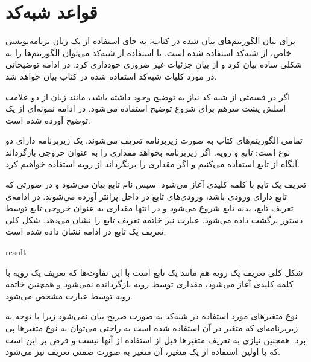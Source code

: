 \section*{قواعد شبه‌کد}

برای بیان الگوریتم‌های بیان شده در کتاب، به جای استفاده از یک زبان برنامه‌نویسی خاص، از شبه‌کد استفاده شده است. با استفاده از شبه‌کد می‌توان الگوریتم‌ها را به شکلی ساده بیان کرد و از بیان جزئیات غیر ضروری خودداری کرد. در ادامه توضیحاتی در مورد کلیات شبه‌کد استفاده شده در کتاب بیان خواهد شد.


اگر در قسمتی از شبه کد نیاز به توضیح وجود داشته باشد، مانند زبان {} از دو علامت اسلش پشت سرهم برای شروع توضیح استفاده می‌شود. در ادامه نمونه‌ای از یک توضیح آورده شده است.

\begin{latin}
\end{latin}


تمامی الگوریتم‌های کتاب به صورت زیربرنامه تعریف می‌شوند. یک زیربرنامه دارای دو نوع است: تابع و رویه. اگر زیربرنامه بخواهد مقداری را به عنوان خروجی بازگرداند آنگاه از تابع استفاده می‌کنیم و اگر مقداری را برنگرداند از رویه استفاده خواهیم کرد. 

تعریف یک تابع با کلمه کلیدی {} آغاز می‌شود. سپس نام تابع بیان می‌شود و در صورتی که تابع دارای ورودی باشد، ورودی‌های تابع در داخل پرانتز آورده می‌شوند. در ادامه‌ی تعریف تابع، بدنه تابع شروع می‌شود و در انتها مقداری به عنوان خروجی تابع توسط دستور {} برگشت داده می‌شود. عبارت {} نیز خاتمه تعریف تابع را نشان می‌دهد. شکل کلی تعریف یک تابع در ادامه نشان داده شده است.

\begin{latin}
\begin{algorithmic}[1]
	\State	{}
	\State	\Return result
\EndFunction
\end{algorithmic}
\end{latin}

شکل کلی تعریف یک رویه هم مانند یک تابع است با این تفاوت‌ها که تعریف یک رویه با کلمه کلیدی {} آغاز می‌شود، مقداری توسط رویه بازگردانده نمی‌شود و همچنین خاتمه رویه توسط عبارت {} مشخص می‌شود.


نوع متغیرهای مورد استفاده در شبه‌کد به صورت صریح بیان نمی‌شود زیرا با توجه به زیربرنامه‌‌ای که متغیر در آن استفاده شده است به راحتی می‌توان به نوع متغیرها پی برد. همچنین نیازی به تعریف متغیرها قبل از استفاده از آنها نیست و فرض بر این است که با اولین استفاده از یک متغیر، آن متغیر به صورت ضمنی تعریف نیز می‌شود.

